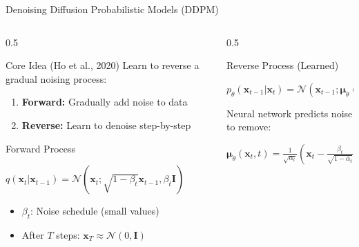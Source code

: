 \documentclass[aspectratio=169]{beamer}
\begin{document}
\begin{frame}{Denoising Diffusion Probabilistic Models (DDPM)}
    \begin{columns}
        \begin{column}{0.5\textwidth}
            \begin{block}{Core Idea (Ho et al., 2020)}
                Learn to reverse a gradual noising process:
                \begin{enumerate}
                    \item \textbf{Forward:} Gradually add noise to data
                    \item \textbf{Reverse:} Learn to denoise step-by-step
                \end{enumerate}
            \end{block}
            
            \begin{block}{Forward Process}
                \begin{center}
                    $q(\mathbf{x}_t | \mathbf{x}_{t-1}) = \mathcal{N}(\mathbf{x}_t; \sqrt{1-\beta_t}\mathbf{x}_{t-1}, \beta_t\mathbf{I})$
                \end{center}
                \begin{itemize}
                    \item $\beta_t$: Noise schedule (small values)
                    \item After $T$ steps: $\mathbf{x}_T \approx \mathcal{N}(0, \mathbf{I})$
                \end{itemize}
            \end{block}
        \end{column}
        \begin{column}{0.5\textwidth}
            \begin{block}{Reverse Process (Learned)}
                \begin{center}
                    $p_\theta(\mathbf{x}_{t-1} | \mathbf{x}_t) = \mathcal{N}(\mathbf{x}_{t-1}; \boldsymbol{\mu}_\theta(\mathbf{x}_t, t), \sigma_t^2\mathbf{I})$
                \end{center}
                Neural network predicts noise to remove:
                \begin{center}
                    $\boldsymbol{\mu}_\theta(\mathbf{x}_t, t) = \frac{1}{\sqrt{\alpha_t}}\left(\mathbf{x}_t - \frac{\beta_t}{\sqrt{1-\bar{\alpha}_t}}\boldsymbol{\epsilon}_\theta(\mathbf{x}_t, t)\right)$
                \end{center}
            \end{block}
            

\end{column}
\end{columns}
\end{frame}
\end{document}
